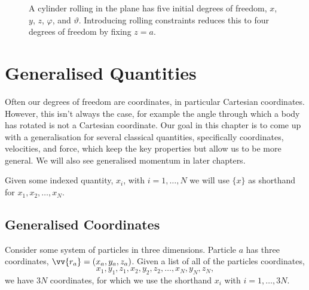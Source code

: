 \documentclass[fleqn]{NotesClass}
\begin{document}
    \begin{figure}
        \caption{A cylinder rolling in the plane has five initial degrees of freedom, \(x\), \(y\), \(z\), \(\varphi\), and \(\vartheta\). Introducing rolling constraints reduces this to four degrees of freedom by fixing \(z = a\).}
    \end{figure}
    
    \chapter{Generalised Quantities}
    Often our degrees of freedom are coordinates, in particular Cartesian coordinates.
    However, this isn't always the case, for example the angle through which a body has rotated is not a Cartesian coordinate.
    Our goal in this chapter is to come up with a generalisation for several classical quantities, specifically coordinates, velocities, and force, which keep the key properties but allow us to be more general.
    We will also see generalised momentum in later chapters.
    
    \begin{ntn}{}{}
        Given some indexed quantity, \(x_i\), with \(i = 1, \dotsc, N\) we will use \(\{x\}\) as shorthand for \(x_1, x_2, \dotsc, x_N\).
    \end{ntn}

    \section{Generalised Coordinates}
    Consider some system of particles in three dimensions.
    Particle \(a\) has three coordinates, \(\vv{r_a} = (x_a, y_a, z_a)\).
    Given a list of all of the particles coordinates,
    \begin{equation}
        x_1, y_1, z_1, x_2, y_2, z_2, \dotsc, x_N, y_N, z_N,
    \end{equation}
    we have \(3N\) coordinates, for which we use the shorthand \(x_i\) with \(i = 1, \dotsc, 3N\).
    
\end{document}
